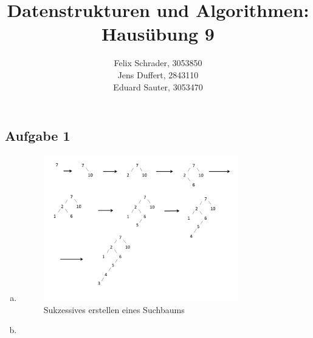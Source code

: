 \documentclass[11pt]{article}
\author{
  Felix Schrader, 3053850 \\ 
  Jens Duffert, 2843110 \\
  Eduard Sauter, 3053470
}
\title{Datenstrukturen und Algorithmen: Haus\"ubung 9}
\begin{document}
\maketitle
\subsection*{Aufgabe 1}
\begin{enumerate}[a)]
	\item
	\begin{figure}[h!]
	\centering	
	\includegraphics[width=0.8\textwidth]{aufgabe_a}
	\caption{Sukzessives erstellen eines Suchbaums}
	\end{figure}
	
	\item
	\begin{figure}[h!]
		
	\end{figure}

\end{enumerate}
\end{document}
